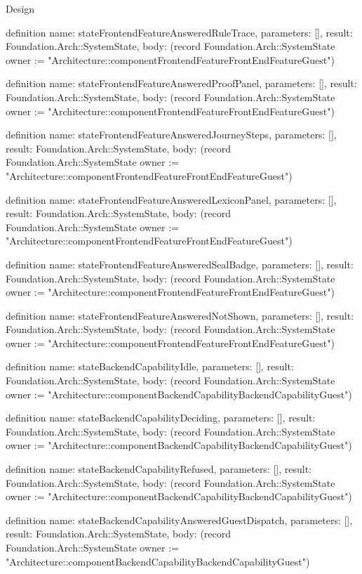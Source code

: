 \begin{lexlean}{Design}
\begin{semanticmodule}
definition{
  name: stateFrontendFeatureAnsweredRuleTrace,
  parameters: [],
  result: Foundation.Arch::SystemState,
  body: (record Foundation.Arch::SystemState {owner := "Architecture::componentFrontendFeatureFrontEndFeatureGuest"})
}

definition{
  name: stateFrontendFeatureAnsweredProofPanel,
  parameters: [],
  result: Foundation.Arch::SystemState,
  body: (record Foundation.Arch::SystemState {owner := "Architecture::componentFrontendFeatureFrontEndFeatureGuest"})
}

definition{
  name: stateFrontendFeatureAnsweredJourneySteps,
  parameters: [],
  result: Foundation.Arch::SystemState,
  body: (record Foundation.Arch::SystemState {owner := "Architecture::componentFrontendFeatureFrontEndFeatureGuest"})
}

definition{
  name: stateFrontendFeatureAnsweredLexiconPanel,
  parameters: [],
  result: Foundation.Arch::SystemState,
  body: (record Foundation.Arch::SystemState {owner := "Architecture::componentFrontendFeatureFrontEndFeatureGuest"})
}

definition{
  name: stateFrontendFeatureAnsweredSealBadge,
  parameters: [],
  result: Foundation.Arch::SystemState,
  body: (record Foundation.Arch::SystemState {owner := "Architecture::componentFrontendFeatureFrontEndFeatureGuest"})
}

definition{
  name: stateFrontendFeatureAnsweredNotShown,
  parameters: [],
  result: Foundation.Arch::SystemState,
  body: (record Foundation.Arch::SystemState {owner := "Architecture::componentFrontendFeatureFrontEndFeatureGuest"})
}

definition{
  name: stateBackendCapabilityIdle,
  parameters: [],
  result: Foundation.Arch::SystemState,
  body: (record Foundation.Arch::SystemState {owner := "Architecture::componentBackendCapabilityBackendCapabilityGuest"})
}

definition{
  name: stateBackendCapabilityDeciding,
  parameters: [],
  result: Foundation.Arch::SystemState,
  body: (record Foundation.Arch::SystemState {owner := "Architecture::componentBackendCapabilityBackendCapabilityGuest"})
}

definition{
  name: stateBackendCapabilityRefused,
  parameters: [],
  result: Foundation.Arch::SystemState,
  body: (record Foundation.Arch::SystemState {owner := "Architecture::componentBackendCapabilityBackendCapabilityGuest"})
}

definition{
  name: stateBackendCapabilityAnsweredGuestDispatch,
  parameters: [],
  result: Foundation.Arch::SystemState,
  body: (record Foundation.Arch::SystemState {owner := "Architecture::componentBackendCapabilityBackendCapabilityGuest"})
}


\end{semanticmodule}
\end{lexlean}
